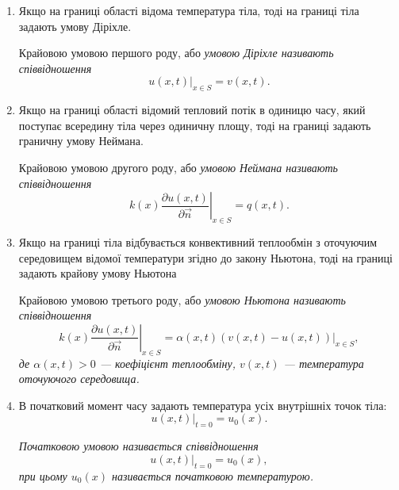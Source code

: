 \begin{enumerate}
	\item Якщо на границі області відома температура тіла, тоді на границі тіла задають умову Діріхле.

	\begin{definition}
		Крайовою умовою першого роду, або \it{умовою Діріхле} називають співвідношення
		\begin{equation}
			\left. u(x, t) \right|_{x \in S} = v(x, t).		 							
		\end{equation}
	\end{definition}

	\item Якщо на границі області відомий тепловий потік в одиницю часу, який поступає всередину тіла через одиничну площу, тоді на границі задають граничну умову Неймана.

	\begin{definition}
		Крайовою умовою другого роду, або \it{умовою Неймана} називають співвідношення
		\begin{equation}
			\left. k(x) \frac{\partial u(x, t)}{\partial \vec n} \right|_{x \in S} = q(x, t).
		\end{equation}
	\end{definition}

	\item Якщо на границі тіла відбувається конвективний теплообмін з оточуючим середовищем відомої температури згідно до закону Ньютона, тоді на границі задають крайову умову Ньютона
	\begin{definition}
		Крайовою умовою третього роду, або \it{умовою Ньютона} називають співвідношення
		\begin{equation}
			\left. k(x) \frac{\partial u(x, t)}{\partial \vec n} \right|_{x \in S} = \left. \alpha(x, t) (v(x, t) - u(x, t)) \right|_{x \in S},
		\end{equation}
		де $\alpha(x, t) > 0$ --- коефіцієнт теплообміну, $v(x, t)$ --- температура оточуючого середовища.
	\end{definition}

	\item В початковий момент часу задають температура усіх внутрішніх точок тіла:
	\begin{equation}
		\left. u(x, t) \right|_{t = 0} = u_0(x).
	\end{equation}

	\begin{definition}
		\it{Початковою умовою} називається співвідношення
		\begin{equation}
			\left. u(x, t) \right|_{t = 0} = u_0(x),
		\end{equation}
		при цьому $u_0(x)$ називається \it{початковою температурою}.
	\end{definition}
\end{enumerate}

